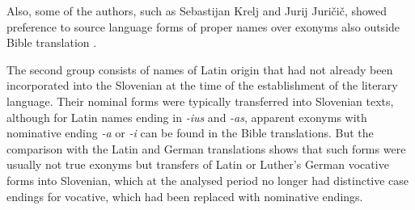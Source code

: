 \documentclass[output=paper,colorlinks,citecolor=brown,arabicfont,chinesefont]{langscibook}
\begin{document}
Also, some of the authors, such as Sebastijan Krelj and Jurij Juričič, showed preference to source language forms of proper names over exonyms also outside Bible translation \citep[71]{Jakopin1986}.

The second group consists of names of Latin origin that had not already been incorporated into the Slovenian at the time of the establishment of the literary language. Their nominal forms were typically transferred into Slovenian texts, although for Latin names ending in \emph{-ius} and \emph{-as}, apparent exonyms with nominative ending \emph{-a} or \emph{-i} can be found in the Bible translations. But the comparison with the Latin and German translations shows that such forms were usually not true exonyms but transfers of Latin or Luther’s German vocative forms into Slovenian, which at the analysed period no longer had distinctive case endings for vocative, which had been replaced with nominative endings. 
\end{document}
